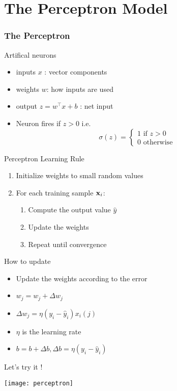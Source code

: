 \documentclass[11pt]{beamer}
\begin{document}
\section{The Perceptron Model}
\label{sec:perceptron}
\begin{frame}[allowframebreaks]
  \frametitle{The Perceptron}
  \begin{block}{Artifical neurons}
    \begin{itemize}
    \item inputs $x$ : vector components
    \item weights $w$: how inputs are used
    \item output $z = w^\top x +b $ : net input
    \item Neuron fires if $z > 0$  i.e. $$\sigma(z) = \begin{cases}
       1 \text{ if } z > 0 \\
       0 \text{ otherwise }
     \end{cases}$$
    \end{itemize}
  \end{block}
  \begin{block}{Perceptron Learning Rule}
    \begin{enumerate}
      \item Initialize weights to small random values
      \item For each training sample ${\mathbf{x}}_i$:
      \begin{enumerate}
        \item Compute the output value $\hat{y}$
        \item Update the weights
        \item Repeat until convergence
      \end{enumerate}
    \end{enumerate}
  \end{block}
  \begin{block}{How to update}
    \begin{itemize}
      \item Update the weights according to the error
      \item $ w_j = w_j + \Delta w_j$
      \item $\Delta w_j = \eta (y_i - \hat{y}_i) x_i(j)$
      \item $\eta$ is the learning rate
      \item $b = b + \Delta b, \Delta b = \eta (y_i - \hat{y}_i)$
    \end{itemize}
  \end{block}
  \begin{center}
    Let's try it !
  \end{center}

\begin{center}
\texttt{[image: perceptron]}
\end{center}
  


\end{frame}
\end{document}
